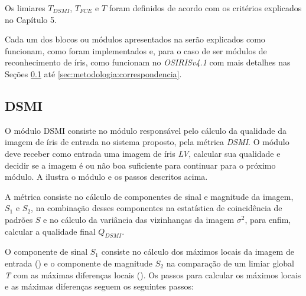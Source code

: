 \par Os limiares $T_{DSMI}$, $T_{FCE}$ e $T$ foram definidos de acordo com os critérios explicados no Capítulo 5.

\par Cada um dos blocos ou módulos apresentados na  serão explicados como funcionam, como foram implementados e, para o caso de ser módulos de reconhecimento de íris, como funcionam no \textit{OSIRISv4.1} com mais detalhes nas Seções \ref{sec:metodologia:dsmi} até \ref{sec:metodologia:correspondencia}.

\subsection{DSMI}\label{sec:metodologia:dsmi}

\par O módulo \acrshort{DSMI} consiste no módulo responsável pelo cálculo da qualidade da imagem de íris de entrada no sistema proposto, pela métrica \textit{\acrshort{DSMI}}. O módulo deve receber como entrada uma imagem de íris \textit{\acrshort{LV}}, calcular sua qualidade e decidir se a imagem é ou não boa suficiente para continuar para o próximo módulo. A  ilustra o módulo e os passos descritos acima.


\par A métrica consiste no cálculo de componentes de sinal e magnitude da imagem, $S_{1}$ e $S_{2}$, na combinação desses componentes na estatística de coincidência de padrões $S$ e no cálculo da variância das vizinhanças da imagem $\sigma^2$, para enfim, calcular a qualidade final $Q_{DSMI}$.

\par O componente de sinal $S_{1}$ consiste no cálculo dos máximos locais da imagem de entrada () e o componente de magnitude $S_{2}$ na comparação de um limiar global \textit{T} com as máximas diferenças locais (). Os passos para calcular os máximos locais e as máximas diferenças seguem os seguintes passos:

